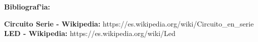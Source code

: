 \documentclass[11pt, letterpaper]{report}
\newenvironment{block}[1]{\hspace{-0.8 cm}\textbf{\Large #1}}{\vspace{3 mm}} %
\newcommand{\bib}[2]{ \textbf{\large #1:} \small #2\\} %
\begin{document}
		
	\begin{block}{Bibliograf'ia:}
	
		\bib{Circuito Serie - Wikipedia}{https://es.wikipedia.org/wiki/Circuito\_en\_serie}
		\hspace*{.5cm}\bib{LED - Wikipedia}{https://es.wikipedia.org/wiki/Led}
	\end{block}
		
\end{document}

